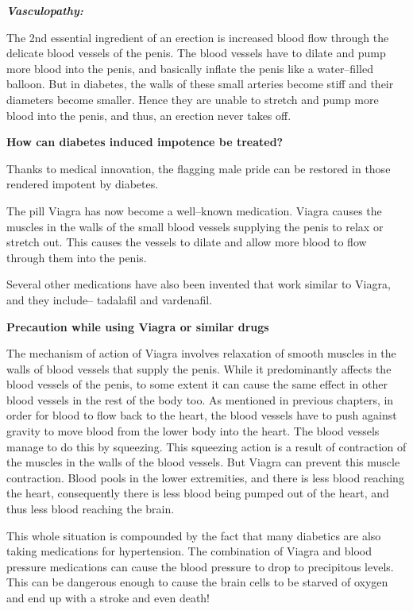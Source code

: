 { \item 
 \textbf{\textit{Vasculopathy:}}

 The 2nd essential ingredient of an erection is increased blood flow through the delicate blood vessels of the penis. The blood vessels have to dilate and pump more blood into the penis, and basically inflate the penis like a water–filled balloon. But in diabetes, the walls of these small arteries become stiff and their diameters become smaller. Hence they are unable to stretch and pump more blood into the penis, and thus, an erection never takes off.



\textbf{How can diabetes induced impotence be treated?}

Thanks to medical innovation, the flagging male pride can be restored in those rendered impotent by diabetes.

The pill Viagra has now become a well–known medication. Viagra causes the muscles in the walls of the small blood vessels supplying the penis to relax or stretch out. This causes the vessels to dilate and allow more blood to flow through them into the penis.

Several other medications have also been invented that work similar to Viagra, and they include– tadalafil and vardenafil.

\textbf{Precaution while using Viagra or similar drugs}

The mechanism of action of Viagra involves relaxation of smooth muscles in the walls of blood vessels that supply the penis. While it predominantly affects the blood vessels of the penis, to some extent it can cause the same effect in other blood vessels in the rest of the body too. As mentioned in previous chapters, in order for blood to flow back to the heart, the blood vessels have to push against gravity to move blood from the lower body into the heart. The blood vessels manage to do this by squeezing. This squeezing action is a result of contraction of the muscles in the walls of the blood vessels. But Viagra can prevent this muscle contraction. Blood pools in the lower extremities, and there is less blood reaching the heart, consequently there is less blood being pumped out of the heart, and thus less blood reaching the brain.

This whole situation is compounded by the fact that many diabetics are also taking medications for hypertension. The combination of Viagra and blood pressure medications can cause the blood pressure to drop to precipitous levels. This can be dangerous enough to cause the brain cells to be starved of oxygen and end up with a stroke and even death!

}
